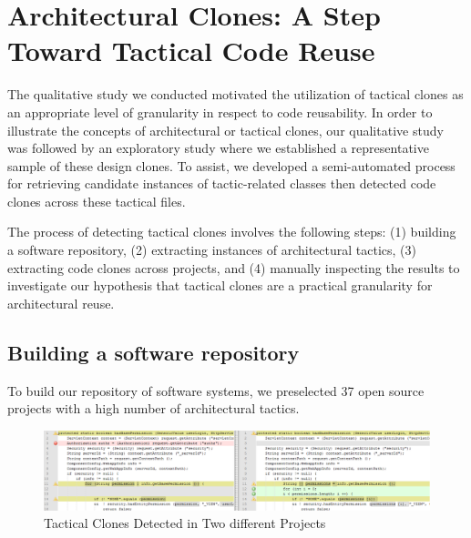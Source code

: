 \section{Architectural Clones: A Step Toward Tactical Code Reuse}
\label{sec:Clones}

The qualitative study we conducted motivated the utilization of tactical clones as an appropriate level of granularity in respect to code reusability. In order to illustrate the concepts of architectural or tactical clones, our qualitative study was followed by an exploratory study where we established a representative sample of these design clones. To assist, we developed a semi-automated process for retrieving candidate instances of tactic-related classes then detected code clones across these tactical files. 

The process of detecting tactical clones involves the following steps: (1) building a software repository, (2) extracting instances of architectural tactics, (3) extracting code clones across projects, and (4) manually inspecting the results to investigate our hypothesis that tactical clones are a practical granularity for architectural reuse.

\subsection{Building a software repository}

To build our repository of software systems, we preselected 37 open source projects with a high number of architectural tactics.

\begin{figure}[!t]
\vspace{-1pt}
\centering
\includegraphics[width=0.9\linewidth]{./img/Permission}
\vspace{-6pt}
\caption{Tactical Clones Detected in Two different Projects}
\label{fig:Permission}
\vspace{-1pt}
\end{figure}



